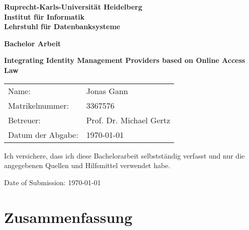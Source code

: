 \documentclass[
     12pt,         %
     a4paper,      %
     BCOR=10mm,version=first,     %
     DIV=14,version=first,        %
     ]{scrreprt}
\begin{document}
\begin{titlepage}
     \vspace*{1cm}
     \begin{center}
          \vspace*{3cm}
          \textbf
          {
               \Large Ruprecht-Karls-Universität Heidelberg\\
               \smallskip
               \Large Institut für Informatik\\
               \smallskip
               \Large Lehrstuhl für Datenbanksysteme\\
               \smallskip
          }

          \vspace{3cm}

          \textbf{\large Bachelor Arbeit}

          \vspace{0.5\baselineskip}
          {
               \huge
               \textbf{Integrating Identity Management Providers based on Online Access Law}
          }

     \end{center}

     \vfill
     {
          \large
          \begin{tabular}[l]{ll}
               Name:                 & Jonas Gann              \\
               Matrikelnummer: & 3367576                 \\
               Betreuer:           & Prof. Dr. Michael Gertz \\
               Datum der Abgabe:   & \today
          \end{tabular}
     }

\end{titlepage}

\onehalfspacing

\thispagestyle{empty}

\vspace*{100pt}
\noindent
Ich versichere, dass ich diese Bachelorarbeit selbstständig verfasst und nur die angegebenen Quellen und Hilfsmittel verwendet habe.

\vspace*{50pt}
\noindent

\underline{\phantom{mmmmmmmmmmmmmmmmmmmm}}

\medskip
\noindent
Date of Submission: \today
\newpage

\chapter*{Zusammenfassung}
\end{document}
